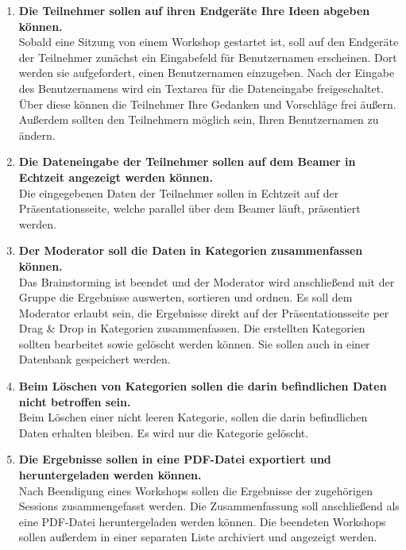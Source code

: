 \begin{enumerate}
Zu Beginn des Workshops sollte der Moderator einen QR\footnote{englisch: Quick Response}-Code zur Teilnahme am Workshop über dem Beamer eingeblendet werden können, sodass die anwesenden Teilnehmer diesen mit ihren Endgeräte einscannen und an diesem Workshop mitwirken können. Die Einladung zur Teilnahme am Workshop sollte ebenfalls auch per Mail gesendet werden können.
\item \textbf{Die Teilnehmer sollen auf ihren Endgeräte Ihre Ideen abgeben können.}\\
Sobald eine Sitzung von einem Workshop gestartet ist, soll auf den Endgeräte der Teilnehmer zunächst ein Eingabefeld für Benutzernamen erscheinen. Dort werden sie aufgefordert, einen Benutzernamen einzugeben. Nach der Eingabe des Benutzernamens wird ein Textarea für die Dateneingabe freigeschaltet. Über diese können die Teilnehmer Ihre Gedanken und Vorschläge frei äußern. Außerdem sollten den Teilnehmern möglich sein, Ihren Benutzernamen zu ändern.
\item \textbf{Die Dateneingabe der Teilnehmer sollen auf dem Beamer in Echtzeit angezeigt werden können.} \\
Die eingegebenen Daten der Teilnehmer sollen in Echtzeit auf der Präsentationsseite, welche parallel über dem Beamer läuft, präsentiert werden.
\item \textbf{Der Moderator soll die Daten in Kategorien zusammenfassen können.}\\
Das Brainstorming ist beendet und der Moderator wird anschließend mit der Gruppe die Ergebnisse auswerten, sortieren und ordnen. Es soll dem Moderator erlaubt sein, die Ergebnisse direkt auf der Präsentationsseite per Drag \& Drop in Kategorien zusammenfassen. Die erstellten Kategorien sollten bearbeitet sowie gelöscht werden können. Sie sollen auch in einer Datenbank gespeichert werden.
\item \textbf{Beim Löschen von Kategorien sollen die darin befindlichen Daten nicht betroffen sein.}\\
Beim Löschen einer nicht leeren Kategorie, sollen die darin befindlichen Daten erhalten bleiben. Es wird nur die Kategorie gelöscht.
\item \textbf{Die Ergebnisse sollen in eine PDF-Datei exportiert und heruntergeladen werden können.}\\
Nach Beendigung eines Workshops sollen die Ergebnisse der zugehörigen Sessions zusammengefasst werden. Die Zusammenfassung soll anschließend als eine PDF-Datei heruntergeladen werden können. Die beendeten Workshops sollen außerdem in einer separaten Liste archiviert und angezeigt werden.
\end{enumerate}

